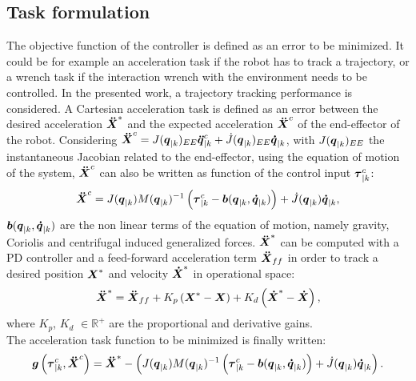 \subsection{Task formulation}
The objective function of the controller is defined as an error to be minimized. It could be for example an acceleration task if the
robot has to track a trajectory, or a wrench task if the interaction wrench with the environment needs to be controlled. In the presented work, a trajectory tracking performance is considered. A Cartesian acceleration task is defined as an error between the desired acceleration $\mbox{\boldmath${\ddot{X}}$}^{*}$ and the expected acceleration $\mbox{\boldmath${\ddot{X}}$}^{c}$ of the end-effector of the robot. Considering $\mbox{\boldmath${\ddot{X}}$}^{c} =  J(\mbox{\boldmath${q}$}_{|k})_{EE} \mbox{\boldmath${\ddot{q}}$}_{|k}^{c} + \dot{J}(\mbox{\boldmath${q}$}_{|k})_{EE} \mbox{\boldmath${\dot{q}}$}_{|k}$, with $J(\mbox{\boldmath${q}$}_{|k})_{EE}$ the instantaneous Jacobian related to the end-effector, using the equation of motion of the system, $\mbox{\boldmath${\ddot{X}}$}^{c}$ can also be written as function of the control input $\mbox{\boldmath${\tau}$}_{|k}^{c}$:
\begin{equation}
\mbox{\boldmath${\ddot{X}}$}^{c} = J(\mbox{\boldmath${q}$}_{|k}) M(\mbox{\boldmath${q}$}_{|k})^{-1} \left(\mbox{\boldmath${\tau}$}_{|k}^{c} - \mbox{\boldmath${b}$}(\mbox{\boldmath${q}$}_{|k},\mbox{\boldmath${\dot{q}}$}_{|k})\right) + \dot{J}(\mbox{\boldmath${q}$}_{|k}) \mbox{\boldmath${\dot{q}}$}_{|k},
\label{Xddot}
\end{equation}
$\mbox{\boldmath${b}$}(\mbox{\boldmath${q}$}_{|k},\mbox{\boldmath${\dot{q}}$}_{|k})$ are the non linear terms of the equation of motion, namely gravity, Coriolis and centrifugal induced generalized forces. $\mbox{\boldmath${\ddot{X}}$}^{*}$ can be computed with a PD controller and a feed-forward acceleration term $\mbox{\boldmath${\ddot{X}}$}_{ff}$ in order to track a desired position $\mbox{\boldmath${X}$}^*$ and velocity $\mbox{\boldmath${\dot{X}}$}^*$ in operational space:
\begin{equation}
\mbox{\boldmath${\ddot{X}}$}^{*} = \mbox{\boldmath${\ddot{X}}$}_{ff} + K_p\left(\mbox{\boldmath${X}$}^{*}-\mbox{\boldmath${X}$}\right) + K_d\left(\mbox{\boldmath${\dot{X}}$}^{*}-\mbox{\boldmath${\dot{X}}$}\right),
\label{accelerationError}
\end{equation}
where $K_p$, $K_d$ $\in \mathbb{R}^{+}$ are the proportional and derivative gains. \\
The acceleration task function to be minimized is finally written:
\begin{equation}
\mbox{\boldmath${g}$}\left(\mbox{\boldmath${\tau}$}_{|k}^c,\mbox{\boldmath${\ddot{X}}$}^c\right) =  \mbox{\boldmath${\ddot{X}}$}^* - \left(J(\mbox{\boldmath${q}$}_{|k}) M(\mbox{\boldmath${q}$}_{|k})^{-1} \left(\mbox{\boldmath${\tau}$}_{|k}^{c} - \mbox{\boldmath${b}$}(\mbox{\boldmath${q}$}_{|k},\mbox{\boldmath${\dot{q}}$}_{|k}) \right) + \dot{J}(\mbox{\boldmath${q}$}_{|k}) \mbox{\boldmath${\dot{q}}$}_{|k}\right).
\label{accelerationError}
\end{equation}
